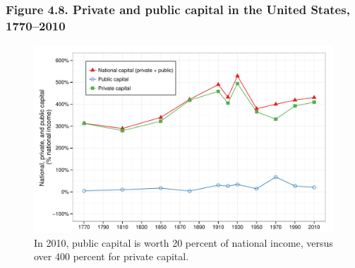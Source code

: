 \documentclass[t]{beamer}\usepackage[]{graphicx}\usepackage[]{color}
\newenvironment{knitrout}{}{} %
\begin{document}
\begin{frame}[label=Figure_4_8]
\frametitle{Figure 4.8. Private and public capital in the United States, 1770--2010}
\begin{figure}[t]
\begin{minipage}[b]{\textwidth}
\centering
\begin{knitrout}\footnotesize
{}\color{fgcolor}

{\centering \includegraphics[width=1\linewidth]{figures/color/Figure_4_8} 

}



\end{knitrout}
\caption{In 2010, public capital is worth 20 percent of national income, versus over 400 percent for private capital.}
\end{minipage}
\end{figure}
\end{frame}
\end{document}

